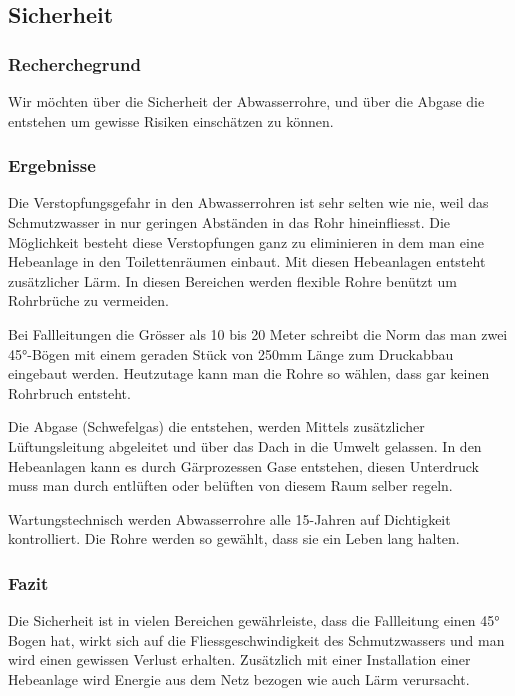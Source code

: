\subsection{Sicherheit}

\subsubsection{Recherchegrund}
Wir möchten über die Sicherheit der Abwasserrohre, und über die Abgase die entstehen um gewisse Risiken einschätzen zu können. 

\subsubsection{Ergebnisse}

Die Verstopfungsgefahr in den Abwasserrohren ist sehr selten wie nie, weil das Schmutzwasser in nur geringen Abständen in das Rohr hineinfliesst. Die Möglichkeit besteht diese Verstopfungen ganz zu eliminieren in dem man eine Hebeanlage in den Toilettenräumen einbaut. Mit diesen Hebeanlagen entsteht zusätzlicher Lärm. In diesen Bereichen werden flexible Rohre benützt um Rohrbrüche zu vermeiden.

Bei Fallleitungen die Grösser als 10 bis 20 Meter schreibt die Norm das man zwei 45°-Bögen mit einem geraden Stück von 250mm Länge zum Druckabbau eingebaut werden. Heutzutage kann man die Rohre so wählen, dass gar keinen Rohrbruch entsteht.

Die Abgase (Schwefelgas) die entstehen, werden Mittels zusätzlicher Lüftungsleitung abgeleitet und über das Dach in die Umwelt gelassen. In den Hebeanlagen kann es durch Gärprozessen Gase entstehen, diesen Unterdruck muss man durch entlüften oder belüften von diesem Raum selber regeln. 

Wartungstechnisch werden Abwasserrohre alle 15-Jahren auf Dichtigkeit kontrolliert. Die Rohre werden so gewählt, dass sie ein Leben lang halten.

\subsubsection{Fazit}
Die Sicherheit ist in vielen Bereichen gewährleiste, dass die Fallleitung einen 45° Bogen hat, wirkt sich auf die Fliessgeschwindigkeit des Schmutzwassers und man wird einen gewissen Verlust erhalten. Zusätzlich mit einer Installation einer Hebeanlage wird Energie aus dem Netz bezogen wie auch Lärm verursacht.

\clearpage 





